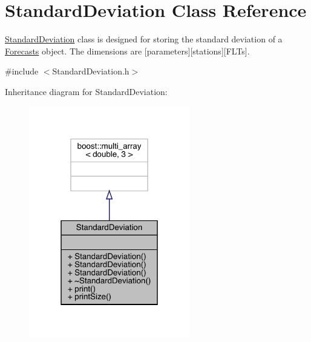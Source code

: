 \hypertarget{class_standard_deviation}{}\section{Standard\+Deviation Class Reference}
\label{class_standard_deviation}


\mbox{\hyperlink{class_standard_deviation}{Standard\+Deviation}} class is designed for storing the standard deviation of a \mbox{\hyperlink{class_forecasts}{Forecasts}} object. The dimensions are \mbox{[}parameters\mbox{]}\mbox{[}stations\mbox{]}\mbox{[}F\+L\+Ts\mbox{]}.  




{\ttfamily \#include $<$Standard\+Deviation.\+h$>$}



Inheritance diagram for Standard\+Deviation\+:
\nopagebreak
\begin{figure}[H]
\begin{center}
\leavevmode
\includegraphics[width=199pt]{class_standard_deviation__inherit__graph}
\end{center}
\end{figure}


